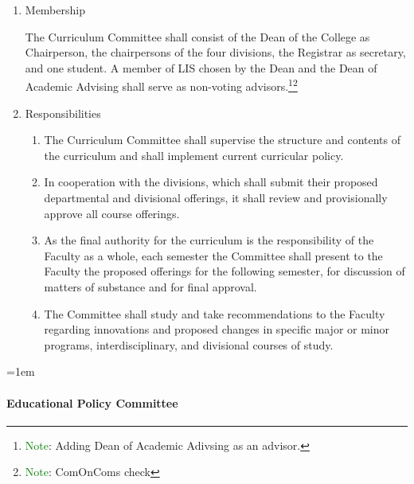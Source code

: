 \documentclass{manual}
\let\oldparagraph\paragraph
\renewcommand\paragraph{\leftskip=1em\oldparagraph}
\newcommand{\editRemark}[3]{\textcolor{green}{#2}\footnote{\textcolor{green}{#1}: #3}}
\newcommand{\editNote}[1]{\editRemark{Note}{}{#1}}
\newcommand{\itemLevelA}{\alph*.}
\newcommand{\itemLevelB}{\arabic*)}
\newcommand{\itemRefA}{\alph*}
\newcommand{\itemRefB}{\arabic*}
\begin{document}
\begin{enumerate}[label=\itemLevelA,ref=\itemRefA]
\item Membership

The Curriculum Committee shall consist of the Dean of the College as Chairperson, the chairpersons of the four divisions, the Registrar as secretary, and one student. A member of LIS chosen by the Dean and the Dean of Academic Advising shall serve as non-voting advisors.\editNote{Adding Dean of Academic Adivsing as an advisor.}\editNote{ComOnComs check}

\item Responsibilities
\begin{enumerate}[label=\itemLevelB,ref=\itemRefB]
\item The Curriculum Committee shall supervise the structure and contents of the curriculum and shall implement current curricular policy.
\item In cooperation with the divisions, which shall submit their proposed departmental and divisional offerings, it shall review and provisionally approve all course offerings.
\item As the final authority for the curriculum is the responsibility of the Faculty as a whole, each semester the Committee shall present to the Faculty the proposed offerings for the following semester, for discussion of matters of substance and for final approval.
\item The Committee shall study and take recommendations to the Faculty regarding innovations and proposed changes in specific major or minor programs, interdisciplinary, and divisional courses of study.

\end{enumerate}
\end{enumerate}

\paragraph{Educational Policy Committee}
\end{document}
